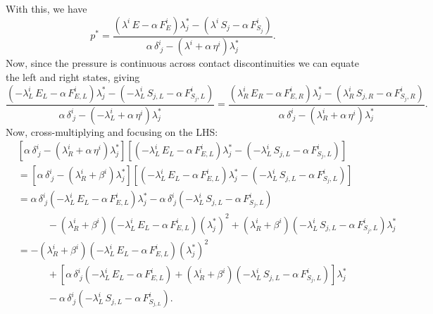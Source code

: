 \documentclass[10pt,preprint]{../aastex}
\begin{document}
With this, we have
\begin{equation}
p^{*}=\frac{\left(\lambda^{i}\,E-\alpha\,F^{i}_{E}\right)\lambda^{*}_{j}-\left(\lambda^{i}\,S_{j}-\alpha\,F^{i}_{S_{j}}\right)}{\alpha\,\delta^{i}_{~j}-\left(\lambda^{i}+\alpha\,\eta^{i}\right)\lambda^{*}_{j}}.
\end{equation}
Now, since the pressure is continuous across contact discontinuities we can equate the left and right states, giving
\begin{equation}
\frac{\left(-\lambda^{i}_{L}\,E_{L}-\alpha\,F^{i}_{E,L}\right)\lambda^{*}_{j}-\left(-\lambda^{i}_{L}\,S_{j,L}-\alpha\,F^{i}_{S_{j},L}\right)}{\alpha\,\delta^{i}_{~j}-\left(-\lambda^{i}_{L}+\alpha\,\eta^{i}\right)\lambda^{*}_{j}}=\frac{\left(\lambda^{i}_{R}\,E_{R}-\alpha\,F^{i}_{E,R}\right)\lambda^{*}_{j}-\left(\lambda^{i}_{R}\,S_{j,R}-\alpha\,F^{i}_{S_{j},R}\right)}{\alpha\,\delta^{i}_{~j}-\left(\lambda^{i}_{R}+\alpha\,\eta^{i}\right)\lambda^{*}_{j}}.
\end{equation}
Now, cross-multiplying and focusing on the LHS:
\begin{align}
&\left[\alpha\,\delta^{i}_{~j}-\left(\lambda^{i}_{R}+\alpha\,\eta^{i}\right)\lambda^{*}_{j}\right]\left[\left(-\lambda^{i}_{L}\,E_{L}-\alpha\,F^{i}_{E,L}\right)\lambda^{*}_{j}-\left(-\lambda^{i}_{L}\,S_{j,L}-\alpha\,F^{i}_{S_{j},L}\right)\right]\\
&=\left[\alpha\,\delta^{i}_{~j}-\left(\lambda^{i}_{R}+\beta^{i}\right)\lambda^{*}_{j}\right]\left[\left(-\lambda^{i}_{L}\,E_{L}-\alpha\,F^{i}_{E,L}\right)\lambda^{*}_{j}-\left(-\lambda^{i}_{L}\,S_{j,L}-\alpha\,F^{i}_{S_{j},L}\right)\right]\\
&=\alpha\,\delta^{i}_{~j}\left(-\lambda^{i}_{L}\,E_{L}-\alpha\,F^{i}_{E,L}\right)\lambda^{*}_{j}-\alpha\,\delta^{i}_{~j}\left(-\lambda^{i}_{L}\,S_{j,L}-\alpha\,F^{i}_{S_{j},L}\right)\\
&\hspace{3em}-\left(\lambda^{i}_{R}+\beta^{i}\right)\left(-\lambda^{i}_{L}\,E_{L}-\alpha\,F^{i}_{E,L}\right)\left(\lambda^{*}_{j}\right)^{2}+\left(\lambda^{i}_{R}+\beta^{i}\right)\left(-\lambda^{i}_{L}\,S_{j,L}-\alpha\,F^{i}_{S_{j},L}\right)\lambda^{*}_{j}\\
&=-\left(\lambda^{i}_{R}+\beta^{i}\right)\left(-\lambda^{i}_{L}\,E_{L}-\alpha\,F^{i}_{E,L}\right)\left(\lambda^{*}_{j}\right)^{2}\\
&\hspace{3em}+\left[\alpha\,\delta^{i}_{~j}\left(-\lambda^{i}_{L}\,E_{L}-\alpha\,F^{i}_{E,L}\right)+\left(\lambda^{i}_{R}+\beta^{i}\right)\left(-\lambda^{i}_{L}\,S_{j,L}-\alpha\,F^{i}_{S_{j},L}\right)\right]\lambda^{*}_{j}\\
&\hspace{3em}-\alpha\,\delta^{i}_{~j}\left(-\lambda^{i}_{L}\,S_{j,L}-\alpha\,F^{i}_{S_{j,L}}\right).
\end{align}
\end{document}
